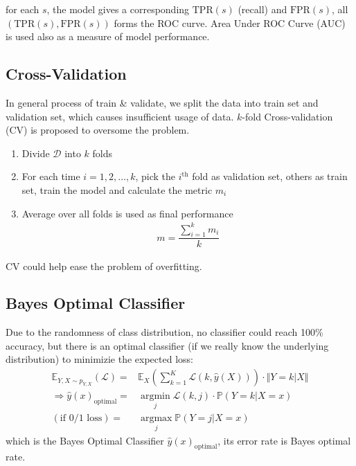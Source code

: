     for each $ s $, the model gives a corresponding $ \mathrm{TPR}(s)  $ (recall) and $ \mathrm{FPR}(s)  $, all $ (\mathrm{TPR}(s),\mathrm{FPR}(s)  ) $ forms the ROC curve. Area Under ROC Curve (AUC) is used also as a measure of model performance.

\subsection{Cross-Validation}
    In general process of train \& validate, we split the data into train set and validation set, which causes insufficient usage of data. $ k $-fold Cross-validation (CV) is proposed to oversome the problem.

    \begin{enumerate}[topsep=2pt,itemsep=2pt]
        \item Divide $ \mathcal{D} $ into $ k $ folds
        \item For each time $ i=1,2,\ldots,k $, pick the $ i^\mathrm{th}  $ fold as validation set, others as train set, train the model and calculate the metric $ m_i $
        \item Average over all folds is used as final performance
        \begin{align}
            m=\dfrac{\sum_{i=1}^km_i}{k} 
        \end{align}
    \end{enumerate}

    CV could help ease the problem of overfitting.
    
        

\subsection{Bayes Optimal Classifier}

    Due to the randomness of class distribution, no classifier could reach 100\% accuracy, but there is an optimal classifier (if we really know the underlying distribution) to minimizie the expected loss:
    \begin{align}
        \mathbb{E}_{Y,X\sim p_{Y,X}}\left( \mathcal{L} \right)=&\mathbb{E}_X\left( \sum_{k=1}^K\mathcal{L}(k,\hat{y}(X)) \right)\cdot \big\Vert Y=k|X \big\Vert    \\
        \Rightarrow \hat{y}(x)_{\mathrm{optimal} }=&\mathop{\arg\min}\limits_{j} \mathcal{L}(k,j)\cdot\mathbb{P}\left( Y=k|X=x \right)\\
        (\text{if 0/1 loss})=&\mathop{\arg\max}\limits_{j}\mathbb{P}\left( Y=j|X=x \right)   
    \end{align}
    which is the Bayes Optimal Classifier $ \hat{y}(x)_{\mathrm{optimal} } $, its error rate is Bayes optimal rate.
    
